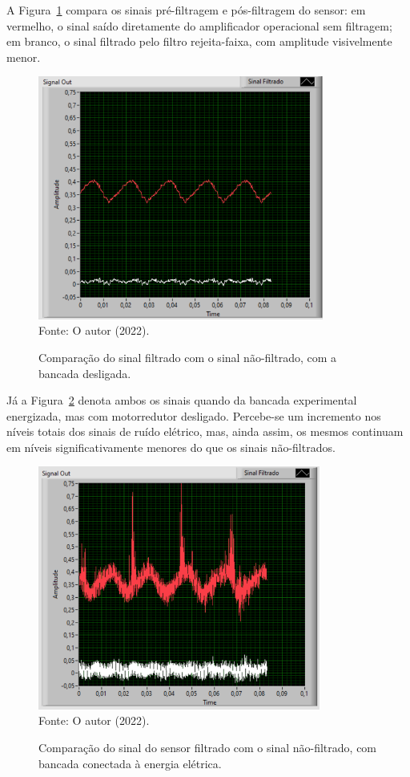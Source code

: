 \documentclass[
	12pt,				
	oneside,			
	a4paper,			
	english,			
	brazil,			
	]{abntex2ppgsi}
\begin{document}
A Figura~\ref{sinal_filtrado_maquina_desligada} compara os sinais pré-filtragem e pós-filtragem do sensor: em vermelho, o sinal saído diretamente do amplificador operacional sem filtragem; em branco, o sinal filtrado pelo filtro rejeita-faixa, com amplitude visivelmente menor.

\begin{figure}[H]
\centering
\caption {Comparação do sinal filtrado com o sinal não-filtrado, com a bancada desligada.}
\includegraphics[width=\textwidth,height=80mm,keepaspectratio]{GraficosAnalise/sinal_filtrado_maquina_desligada} \\
Fonte: O autor (2022).
\label{sinal_filtrado_maquina_desligada}
\end{figure} 

Já a Figura~\ref{sinal_filtrado_maquina_ligada_tomada} denota ambos os sinais quando da bancada experimental energizada, mas com motorredutor desligado. Percebe-se um incremento nos níveis totais dos sinais de ruído elétrico, mas, ainda assim, os mesmos continuam em níveis significativamente menores do que os sinais não-filtrados.

\begin{figure}[H]
\centering
\caption {Comparação do sinal do sensor filtrado com o sinal não-filtrado, com bancada conectada à energia elétrica.}
\includegraphics[width=\textwidth,height=80mm,keepaspectratio]{GraficosAnalise/sinal_filtrado_maquina_ligada_tomada} \\
Fonte: O autor (2022).
\label{sinal_filtrado_maquina_ligada_tomada}
\end{figure} 
\end{document}
